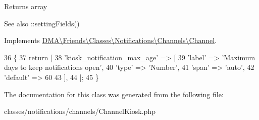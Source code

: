 \begin{DoxyReturn}{Returns}
array
\end{DoxyReturn}
 \begin{DoxySeeAlso}{See also}
\+::setting\+Fields() 
\end{DoxySeeAlso}


Implements \hyperlink{interfaceDMA_1_1Friends_1_1Classes_1_1Notifications_1_1Channels_1_1Channel_aa473115fa58a6fa5f57a9069f23dd771}{D\+M\+A\textbackslash{}\+Friends\textbackslash{}\+Classes\textbackslash{}\+Notifications\textbackslash{}\+Channels\textbackslash{}\+Channel}.


\begin{DoxyCode}
36     \{
37         \textcolor{keywordflow}{return} [
38             \textcolor{stringliteral}{'kiosk\_notification\_max\_age'} => [
39                 \textcolor{stringliteral}{'label'} => \textcolor{stringliteral}{'Maximum days to keep notifications open'},
40                 \textcolor{stringliteral}{'type'}  => \textcolor{stringliteral}{'Number'},
41                 \textcolor{stringliteral}{'span'}  => \textcolor{stringliteral}{'auto'},
42                 \textcolor{stringliteral}{'default'} => 60
43             ],
44         ];
45     \}
\end{DoxyCode}


The documentation for this class was generated from the following file\+:\begin{DoxyCompactItemize}
\item 
classes/notifications/channels/Channel\+Kiosk.\+php\end{DoxyCompactItemize}
